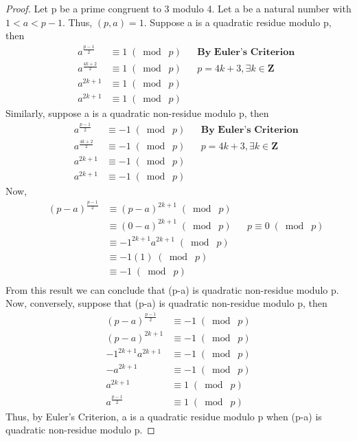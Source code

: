\documentclass{article}
\begin{document}
\begin{proof}
Let p be a prime congruent to 3 modulo 4. Let a be a natural number with $1<a<p-1$. Thus, $(p, a) = 1$. Suppose a is a quadratic residue modulo p, then
\begin{align*}
    &&a^{\frac{p-1}{2}} &\equiv 1 \;(\bmod\; p) && \textbf{By Euler's Criterion}\\
    &&a^{\frac{4k+2}{2}} &\equiv 1 \;(\bmod\; p) && p = 4k + 3, \exists k \in \mathbf{Z}\\
    &&a^{2k+1} &\equiv 1 \;(\bmod\; p) &&\\
    &&a^{2k+1} &\equiv 1 \;(\bmod\; p) &&
\end{align*}
Similarly, suppose a is a quadratic non-residue modulo p, then
\begin{align*}
    &&a^{\frac{p-1}{2}} &\equiv -1 \;(\bmod\; p) && \textbf{By Euler's Criterion}\\
    &&a^{\frac{4k+2}{2}} &\equiv -1 \;(\bmod\; p) && p = 4k + 3, \exists k \in \mathbf{Z}\\
    &&a^{2k+1} &\equiv -1 \;(\bmod\; p) &&\\
    &&a^{2k+1} &\equiv -1 \;(\bmod\; p) &&
\end{align*}
Now,
\begin{align*}
    &&(p-a)^{\frac{p-1}{2}} &\equiv (p-a)^{2k+1} \;(\bmod\; p) &&\\
    && &\equiv (0-a)^{2k+1} \;(\bmod\; p) && p \equiv 0 \;(\bmod\; p)\\
    && &\equiv -1^{2k+1}a^{2k+1} \;(\bmod\; p) && \\
    && &\equiv -1(1) \;(\bmod\; p) && \\
    && &\equiv -1 \;(\bmod\; p) && \\
\end{align*}
From this result we can conclude that (p-a) is quadratic non-residue modulo p.\\
Now, conversely, suppose that (p-a) is quadratic non-residue modulo p, then
\begin{align*}
    &&(p-a)^{\frac{p-1}{2}} &\equiv -1 \;(\bmod\; p) && \\
    &&(p-a)^{2k+1} &\equiv -1 \;(\bmod\; p) &&\\
    &&-1^{2k+1}a^{2k+1} &\equiv -1 \;(\bmod\; p) &&\\
    &&-a^{2k+1} &\equiv -1 \;(\bmod\; p) &&\\
    &&a^{2k+1} &\equiv 1 \;(\bmod\; p) &&\\
    &&a^{\frac{p-1}{2}} &\equiv 1 \;(\bmod\; p) &&
\end{align*}
Thus, by Euler's Criterion, a is a quadratic residue modulo p when (p-a) is quadratic non-residue modulo p.
\end{proof}
\end{document}
